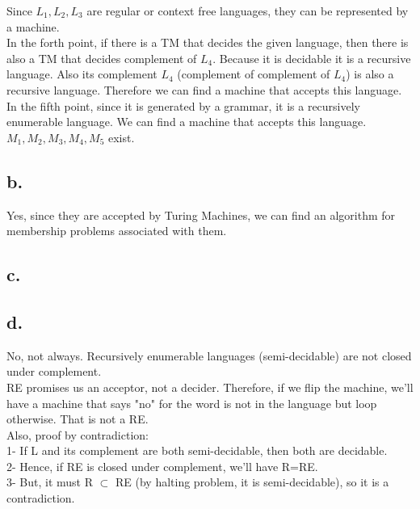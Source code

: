 \documentclass[12pt]{article}
\begin{document}
Since $L_1 , L_2 , L_3$ are regular or context free languages, they can be represented by a machine.\\

In the forth point, if there is a TM that decides the given language, then there is also a TM that decides complement of $L_4$. Because it is decidable it is a recursive language. Also its complement $L_4$ (complement of complement of $L_4$) is also a recursive language. Therefore we can find a machine that accepts this language.\\

In the fifth point, since it is generated by a grammar, it is a recursively enumerable language. We can find a machine that accepts this language.\\

$M_1 , M_2 , M_3 , M_4 , M_5$ exist.\\

\subsection*{b.}

Yes, since they are accepted by Turing Machines, we can find an algorithm for membership problems associated with them.\\

\subsection*{c.}

\subsection*{d.}
No, not always. Recursively enumerable languages (semi-decidable) are not closed under complement.\\
RE promises us an acceptor, not a decider. Therefore, if we flip the machine, we'll have a machine that says "no" for the word is not in the language but loop otherwise. That is not a RE.\\
Also, proof by contradiction:\\
1- If L and its complement are both semi-decidable, then both are decidable.\\
2- Hence, if RE is closed under complement, we'll have R=RE.\\
3- But, it must R $\subset$ RE (by halting problem, it is semi-decidable), so it is a contradiction.

\end{document}
